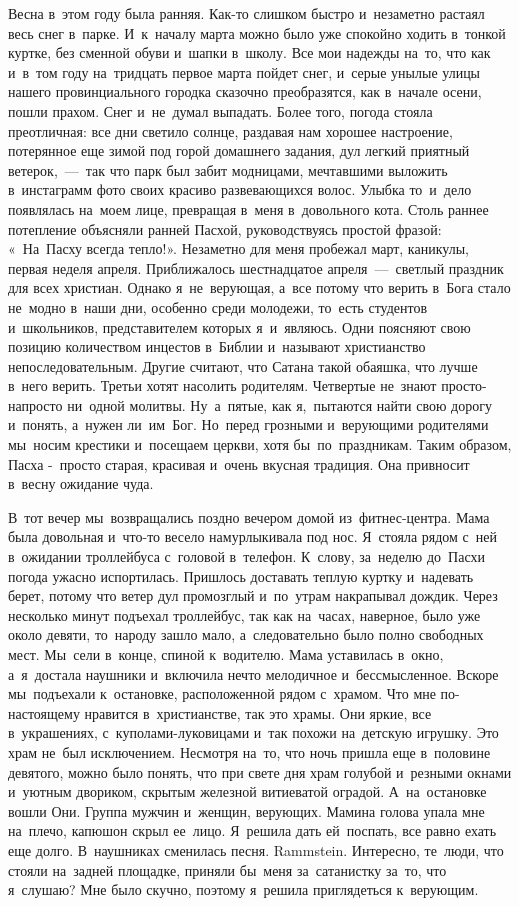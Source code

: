 Весна в~этом году была ранняя.
Как-то слишком быстро и~незаметно растаял весь снег в~парке.
И~к~началу марта можно было уже спокойно ходить в~тонкой куртке, без сменной обуви и~шапки в~школу.
Все мои надежды на~то, что как и~в~том году на~тридцать первое марта пойдет снег, и~серые унылые улицы нашего провинциального городка сказочно преобразятся, как в~начале осени, пошли прахом.
Снег и~не~думал выпадать.
Более того, погода стояла преотличная: все дни светило солнце, раздавая нам хорошее настроение, потерянное еще зимой под горой домашнего задания, дул легкий приятный ветерок,~---~так что парк был забит модницами, мечтавшими выложить в~инстаграмм фото своих красиво развевающихся волос.
Улыбка то~и~дело появлялась на~моем лице, превращая в~меня в~довольного кота.
Столь раннее потепление объясняли ранней Пасхой, руководствуясь простой фразой: «~На~Пасху всегда тепло!».
Незаметно для меня пробежал март, каникулы, первая неделя апреля.
Приближалось шестнадцатое апреля~---~светлый праздник для всех христиан.
Однако я~не~верующая, а~все потому что верить в~Бога стало не~модно в~наши дни, особенно среди молодежи, то~есть студентов и~школьников, представителем которых я~и~являюсь.
Одни поясняют свою позицию количеством инцестов в~Библии и~называют христианство непоследовательным.
Другие считают, что Сатана такой обаяшка, что лучше в~него верить.
Третьи хотят насолить родителям.
Четвертые не~знают просто-напросто ни~одной молитвы.
Ну~а~пятые, как я,~пытаются найти свою дорогу и~понять, а~нужен ли~им~Бог.
Но~перед грозными и~верующими родителями мы~носим крестики и~посещаем церкви, хотя бы~по~праздникам.
Таким образом, Пасха -~просто старая, красивая и~очень вкусная традиция.
Она привносит в~весну ожидание чуда.
 
В~тот вечер мы~возвращались поздно вечером домой из~фитнес-центра.
Мама была довольная и~что-то весело намурлыкивала под нос.
Я~стояла рядом с~ней в~ожидании троллейбуса с~головой в~телефон.
К~слову, за~неделю до~Пасхи погода ужасно испортилась.
Пришлось доставать теплую куртку и~надевать берет, потому что ветер дул промозглый и~по~утрам накрапывал дождик.
Через несколько минут подъехал троллейбус, так как на~часах, наверное, было уже около девяти, то~народу зашло мало, а~следовательно было полно свободных мест.
Мы~сели в~конце, спиной к~водителю.
Мама уставилась в~окно, а~я~достала наушники и~включила нечто мелодичное и~бессмысленное.
Вскоре мы~подъехали к~остановке, расположенной рядом с~храмом.
Что мне по-настоящему нравится в~христианстве, так это храмы.
Они яркие, все в~украшениях, с~куполами-луковицами и~так похожи на~детскую игрушку.
Это храм не~был исключением.
Несмотря на~то, что ночь пришла еще в~половине девятого, можно было понять, что при свете дня храм голубой и~резными окнами и~уютным двориком, скрытым железной витиеватой оградой.
А~на~остановке вошли Они.
Группа мужчин и~женщин, верующих.
Мамина голова упала мне на~плечо, капюшон скрыл ее~лицо.
Я~решила дать ей~поспать, все равно ехать еще долго.
В~наушниках сменилась песня.
Rammstein.
Интересно, те~люди, что стояли на~задней площадке, приняли бы~меня за~сатанистку за~то, что я~слушаю? Мне было скучно, поэтому я~решила приглядеться к~верующим.

